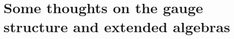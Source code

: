 
\section{Some thoughts on the gauge structure and extended algebras\label{sec:GaugeStructureAndExtendedAlgebras}}
